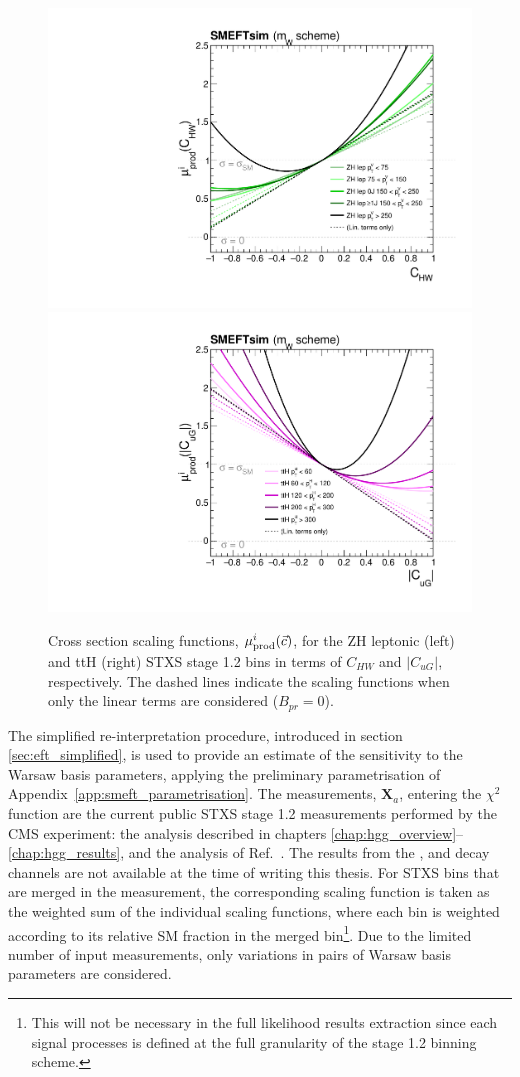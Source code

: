 \begin{figure}[htb!]
  \centering
  \includegraphics[width=.48\textwidth]{Figures/eft/scaling_functions/ZH_lep_vs_chw_smeft.pdf}
  \includegraphics[width=.48\textwidth]{Figures/eft/scaling_functions/ttH_vs_cugabs_smeft.pdf}
  \caption[Warsaw basis cross section scaling functions for ZH leptonic and ttH STXS stage 1.2 bins]
  {
    Cross section scaling functions, $\mu_{\rm{prod}}^i(\vec{c})$, for the ZH leptonic (left) and ttH (right) STXS stage 1.2 bins in terms of $C_{HW}$ and $|C_{uG}|$, respectively. The dashed lines indicate the scaling functions when only the linear terms are considered ($B_{pr}=0$).
  }
  \label{fig:smeft_sf_1d}
\end{figure}

The simplified re-interpretation procedure, introduced in section \ref{sec:eft_simplified}, is used to provide an estimate of the sensitivity to the Warsaw basis parameters, applying the preliminary parametrisation of Appendix~\ref{app:smeft_parametrisation}. The measurements, $\mathbf{X}_a$, entering the $\chi^2$ function are the current public STXS stage 1.2 measurements performed by the CMS experiment: the \Hgg analysis described in chapters \ref{chap:hgg_overview}--\ref{chap:hgg_results}, and the \Hfl analysis of Ref.~\cite{Sirunyan:2021rug}. The results from the \Htautau, \Hbb and \HWW decay channels are not available at the time of writing this thesis. For STXS bins that are merged in the measurement, the corresponding scaling function is taken as the weighted sum of the individual scaling functions, where each bin is weighted according to its relative SM fraction in the merged bin\footnote{This will not be necessary in the full likelihood results extraction since each signal processes is defined at the full granularity of the stage 1.2 binning scheme.}. Due to the limited number of input measurements, only variations in pairs of Warsaw basis parameters are considered.

